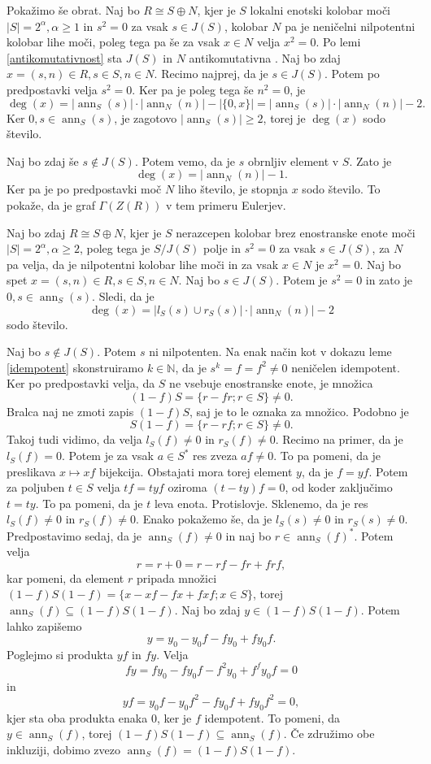 \documentclass[a4paper, 12pt]{amsart}
\theoremstyle{definition} %
\theoremstyle{plain} %
\newcommand{\N}{\mathbb N}
\DeclareMathOperator{\ann}{ann}
\begin{document}
Pokažimo še obrat. Naj bo $R\cong S\oplus N$, kjer je $S$ lokalni enotski kolobar moči $|S| = 2^{\alpha}, \alpha \ge 1$ in $s^2 = 0 $ za vsak $s\in J(S)$, kolobar $N$ pa je neničelni nilpotentni kolobar lihe moči, poleg tega pa še za vsak $x\in N$ velja $x^2 = 0$. Po lemi \ref{antikomutativnost} sta $J(S)$ in $N$ antikomutativna . Naj bo zdaj $x= (s,n) \in R, s\in S, n\in N$. Recimo najprej, da je $s\in J(S)$. Potem po predpostavki velja $s^2 = 0$. Ker pa je poleg tega še $n^2 = 0$, je 
$$
\deg(x) = |\ann_S(s)|\cdot|\ann_N(n)| - |\{0,x\}| =   |\ann_S(s)|\cdot|\ann_N(n)| - 2.
$$
Ker $0,s\in \ann_S(s)$, je zagotovo $|\ann_S(s)|\ge 2$, torej je $\deg(x)$ sodo število.

Naj bo zdaj še $s\notin J(S)$. Potem vemo, da je $s$ obrnljiv element v $S$. Zato je 
$$
\deg(x) = |\ann_N(n)| - 1.
$$
Ker pa je po predpostavki moč $N$ liho število, je stopnja $x$ sodo število. To pokaže, da je graf $\Gamma(Z(R))$ v tem primeru Eulerjev.

Naj bo zdaj $R\cong S\oplus N$, kjer je $S$ nerazcepen kolobar brez enostranske enote moči $|S| = 2^{\alpha}, \alpha \ge 2$, poleg tega je $S/J(S)$ polje in $s^2 = 0$ za vsak $s\in J(S)$, za $N$ pa velja, da je nilpotentni kolobar lihe moči in za vsak $x\in N$ je $x^2 = 0$. Naj bo spet $x=(s,n)\in R, s\in S, n\in N$. Naj bo $s\in J(S)$. Potem je $s^2 = 0$ in zato je $0,s \in \ann_S(s)$. Sledi, da je  
$$
\deg(x) = |l_S(s) \cup r_S(s)|\cdot |\ann_N(n)| - 2
$$
sodo število.

Naj bo $s\notin J(S)$. Potem $s$ ni nilpotenten. Na enak način kot v dokazu leme \ref{idempotent} skonstruiramo $k\in \N$, da je $s^k = f = f^2\neq 0$ neničelen idempotent. Ker po predpostavki velja, da $S$ ne vsebuje enostranske enote, je množica
$$
(1-f)S = \{r-fr; r\in S\}\neq 0.
$$
Bralca naj ne zmoti zapis $(1-f)S$, saj je to le oznaka za množico. Podobno je 
$$
S(1-f) = \{r-rf;r\in S\} \neq 0.
$$
Takoj tudi vidimo, da velja $l_S(f) \neq 0$ in $r_S(f) \neq 0$. Recimo na primer, da je $l_S(f)=0$. Potem je za vsak $a\in S^*$ res zveza $af \neq 0$. To pa pomeni, da je preslikava $x\mapsto xf$ bijekcija. Obstajati mora torej element $y$, da je $f=yf$. Potem za poljuben $t\in S$ velja $tf = tyf$ oziroma $(t-ty)f=0 $, od koder zaključimo $t = ty$. To pa pomeni, da je $t$ leva enota. Protislovje. Sklenemo, da je res $l_S(f) \neq 0$ in $r_S(f) \neq 0$. Enako pokažemo še, da je $l_S(s) \neq 0$ in $r_S(s) \neq 0$. Predpostavimo sedaj, da je $\ann_S(f) \neq 0$ in naj bo $r\in \ann_S(f)^*$. Potem velja
$$
r = r + 0 = r - rf - fr + frf, 
$$
kar pomeni, da element $r$ pripada množici $(1-f)S(1-f) = \{x-xf-fx+fxf; x\in S\}$, torej $\ann_S(f) \subseteq (1-f)S(1-f)$. Naj bo zdaj $y\in (1-f)S(1-f)$. Potem lahko zapišemo 
$$
y = y_0 - y_0 f -f y_0 + fy_0 f.
$$
Poglejmo si produkta $yf$ in $fy$. Velja 
$$
fy = fy_0 - fy_0 f - f^2 y_0 + f^f y_0 f = 0
$$
in
$$
yf = y_0 f - y_0 f^2 - fy_0 f + fy_0 f^2=0,
$$
kjer sta oba produkta enaka 0, ker je $f$ idempotent. To pomeni, da $y\in \ann_S(f)$, torej $(1-f)S(1-f) \subseteq \ann_S(f)$. Če združimo obe inkluziji, dobimo zvezo $\ann_S(f) = (1-f)S(1-f)$.
\end{document}
